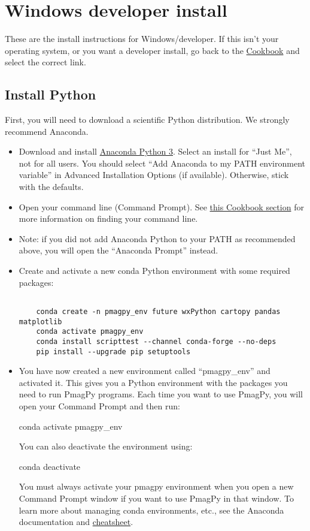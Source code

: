 \documentclass[11pt]{article}
\begin{document}
\tableofcontents


\section{Windows developer install}

These are the install instructions for Windows/developer.  If this isn't your operating system, or you want a developer install, go back to the \href{https://earthref.org/PmagPy/cookbook/#next_steps}{Cookbook} and select the correct link.


\subsection{Install Python}

First, you will need to download a scientific Python distribution.  We strongly recommend Anaconda.

   \begin{itemize}
   \item Download and install \href{https://www.anaconda.com/download}{Anaconda Python 3}.  Select an install for “Just Me”, not for all users.  You should select ``Add Anaconda to my PATH environment variable'' in Advanced Installation Options (if available).  Otherwise, stick with the defaults.
   \item Open your command line (Command Prompt). See \href{https://earthref.org/PmagPy/cookbook/#command_line}{this Cookbook section} for more information on finding your command line.
   \item Note: if you did not add Anaconda Python to your PATH as recommended above, you will open the ``Anaconda Prompt'' instead.
   \item Create and activate a new conda Python environment with some required packages: \begin{verbatim}

    conda create -n pmagpy_env future wxPython cartopy pandas matplotlib
    conda activate pmagpy_env
    conda install scripttest --channel conda-forge --no-deps
    pip install --upgrade pip setuptools
\end{verbatim}
   \item You have now created a new environment called ``pmagpy_env'' and activated it.  This gives you a Python environment with the packages you need to run PmagPy programs.  Each time you want to use PmagPy, you will open your Command Prompt and then run:

     conda activate pmagpy_env

     You can also deactivate the environment using:

     conda deactivate

     You must always activate your pmagpy environment when you open a new Command Prompt window if you want to use PmagPy in that window.  To learn more about managing conda environments, etc., see the Anaconda documentation and \href{https://docs.anaconda.com/anaconda/user-guide/cheatsheet/}{cheatsheet}.

\end{itemize}
\end{document}

